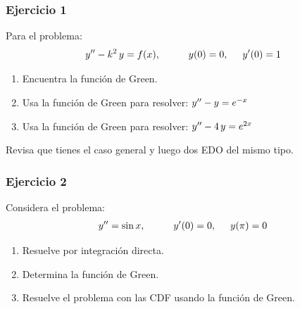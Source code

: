 \documentclass[12pt]{beamer}
\begin{document}
\begin{frame}
\frametitle{Ejercicio 1}
Para el problema:
\begin{align*}
    {y}^{\prime \prime} - k^{2} \, y = f (x), \hspace{1cm} y (0) = 0, \hspace{0.5cm} {y}^{\prime} (0) = 1
\end{align*}

\vspace{-0.25cm}
\begin{enumerate}
\item Encuentra la función de Green.
\item Usa la función de Green para resolver: ${y}^{\prime \prime} - y = e^{-x}$
\item Usa la función de Green para resolver: ${y}^{\prime \prime} - 4 \, y = e^{2x}$
\end{enumerate}
Revisa que tienes el caso general y luego dos EDO del mismo tipo.
\end{frame}

\begin{frame}
\frametitle{Ejercicio 2}
Considera el problema:
\begin{align*}
    {y}^{\prime \prime} = \sin x, \hspace{1cm} {y}^{\prime} (0) = 0, \hspace{0.5cm} y (\pi) = 0
\end{align*}

\vspace{-0.25cm}
\begin{enumerate}[<+->]
\item Resuelve por integración directa.
\item Determina la función de Green.
\item Resuelve el problema con las CDF usando la función de Green.
\end{enumerate}
\end{frame}
\end{document}
